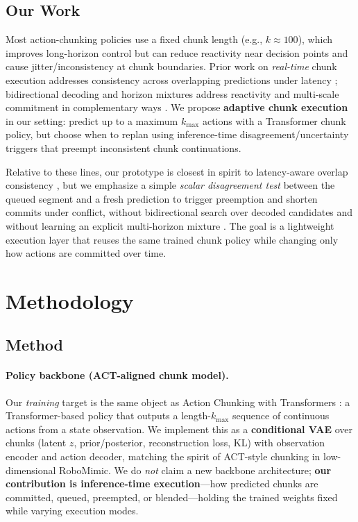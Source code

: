 \documentclass{article}
\begin{document}
\subsection{Our Work}

Most action-chunking policies use a fixed chunk length (e.g., $k \approx 100$), which improves long-horizon control but can reduce reactivity near decision points and cause jitter/inconsistency at chunk boundaries. Prior work on \emph{real-time} chunk execution addresses consistency across overlapping predictions under latency \cite{real_time_chunking}; bidirectional decoding and horizon mixtures address reactivity and multi-scale commitment in complementary ways \cite{bidirect,mixtureofhorizons}. We propose \textbf{adaptive chunk execution} in our setting: predict up to a maximum $k_{\max}$ actions with a Transformer chunk policy, but choose when to replan using inference-time disagreement/uncertainty triggers that preempt inconsistent chunk continuations.

Relative to these lines, our prototype is closest in spirit to latency-aware overlap consistency \cite{real_time_chunking}, but we emphasize a simple \emph{scalar disagreement test} between the queued segment and a fresh prediction to trigger preemption and shorten commits under conflict, without bidirectional search over decoded candidates \cite{bidirect} and without learning an explicit multi-horizon mixture \cite{mixtureofhorizons}. The goal is a lightweight execution layer that reuses the same trained chunk policy while changing only how actions are committed over time.

\section{Methodology}

\subsection{Method}

\paragraph{Policy backbone (ACT-aligned chunk model).}
Our \emph{training} target is the same object as Action Chunking with Transformers \cite{zhao2023}: a Transformer-based policy that outputs a length-$k_{\max}$ sequence of continuous actions from a state observation. We implement this as a \textbf{conditional VAE} over chunks (latent $z$, prior/posterior, reconstruction loss, KL) with observation encoder and action decoder, matching the spirit of ACT-style chunking in low-dimensional RoboMimic. We do \emph{not} claim a new backbone architecture; \textbf{our contribution is inference-time execution}---how predicted chunks are committed, queued, preempted, or blended---holding the trained weights fixed while varying execution modes.
\end{document}
